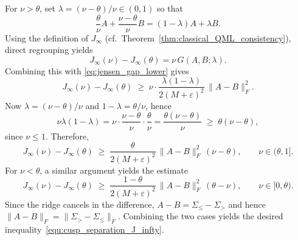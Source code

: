 \documentclass[10pt, letterpaper]{amsart}
\begin{document}
\medskip
For $\nu>\theta$, set $\lambda=(\nu-\theta)/\nu\in(0,1)$ so that
\[
\frac{\theta}{\nu}A+\frac{\nu-\theta}{\nu}B=(1-\lambda)A+\lambda B.
\]
Using the definition of $J_\infty$ (cf.~Theorem~\ref{thm:classical_QML_consistency}), direct regrouping yields
\[
J_\infty(\nu)-J_\infty(\theta)=\nu\,G(A,B;\lambda).
\]
Combining this with \eqref{eq:jensen_gap_lower} gives
\[
J_\infty(\nu)-J_\infty(\theta)
\;\ge\;
\nu\cdot \frac{\lambda(1-\lambda)}{2(M + \varepsilon)^2}\,\|A-B\|_F^2.
\]
Now $\lambda=(\nu-\theta)/\nu$ and $1-\lambda=\theta/\nu$, hence
\[
\nu\lambda(1-\lambda)=\nu\cdot\frac{\nu-\theta}{\nu}\cdot\frac{\theta}{\nu}
=\frac{\theta(\nu-\theta)}{\nu}\;\ge\;\theta(\nu-\theta),
\]
since $\nu\le 1$.
Therefore,
\[
J_\infty(\nu)-J_\infty(\theta)
\;\ge\;
\frac{\theta}{2(M +\varepsilon)^2}\,\|A-B\|_F^2\,(\nu-\theta),
\qquad \nu\in(\theta,1].
\]
For $\nu<\theta$, a similar argument yields the estimate 
\[
J_\infty(\nu)-J_\infty(\theta)
\;\ge\;
\frac{1-\theta}{2(M+\varepsilon)^2}\,\|A-B\|_F^2\,(\theta-\nu),
\qquad \nu\in[0,\theta).
\]
 Since the ridge cancels in the difference, $A-B=\Sigma_{\leq}-\Sigma_{>}$ and hence $\|A-B\|_F=\|\Sigma_{>}-\Sigma_{\leq}\|_F$. Combining the two cases yields the desired inequality~\eqref{equ:cusp_separation_J_infty}.\medskip
\end{document}
